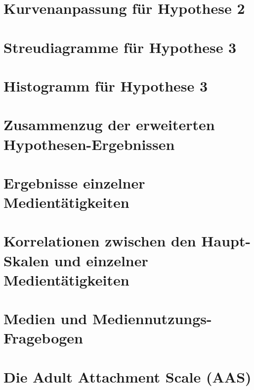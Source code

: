 \section{Kurvenanpassung für Hypothese 2}\label{app:Hypo2_Kurvenanpassung}

\newpage
\section{Streudiagramme für Hypothese 3}\label{app:Hypo3_Streudiagramm}

\newpage
\section{Histogramm für Hypothese 3}\label{app:Hypo3_Histogramm}

\newpage

\section{Zusammenzug der erweiterten Hypothesen-Ergebnissen}\label{app:ZusammenzugResultate}

\newpage

\section{Ergebnisse einzelner Medientätigkeiten}\label{app:ResultateMedientaetigkeiten}

\newpage

\section{Korrelationen zwischen den Haupt-Skalen und einzelner Medientätigkeiten}\label{app:Korrelationen}

\newpage

\section{Medien und Mediennutzungs-Fragebogen}\label{app:MedienFragebogen}

\newpage

\section{Die Adult Attachment Scale (AAS)}\label{app:AAS}

\newpage

